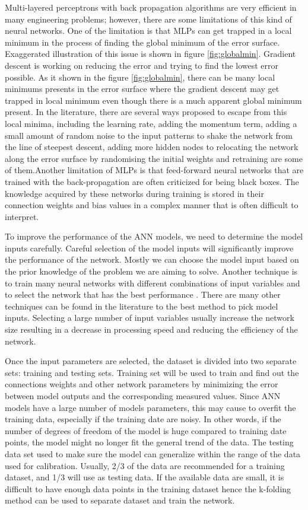 Multi-layered perceptrons with back propagation algorithms are very efficient in many engineering problems; however, there are some limitations of this kind of neural networks. One of the limitation is that MLPs can get trapped in a local minimum in the process of finding the global minimum of the error surface. Exaggerated illustration of this issue is shown in figure \ref{fig:globalmin}. Gradient descent is working on reducing the error and trying to find the lowest error possible. As it shown in the figure  \ref{fig:globalmin}, there can be many local minimums presents in the error surface where the gradient descent may get trapped in local minimum even though there is a much apparent global minimum present.  In the literature, there are several ways proposed to escape from this local minima, including the learning rate, adding the momentum term, adding a small amount of random noise to the input patterns to shake the network from the line of steepest descent, adding more hidden nodes to relocating the network along the error surface by randomising the initial weights and retraining are some of them.Another limitation of MLPs is that feed-forward neural networks that are trained with the back-propagation are often criticized for being black boxes. The knowledge acquired by these networks during training is stored in their connection weights and bias values in a complex manner that is often difficult to interpret. 


To improve the performance of the ANN models,  we need to determine the model inputs carefully. Careful selection of the model inputs will significantly improve the performance of the network. Mostly we can choose the model input based on the prior knowledge of the problem we are aiming to solve. Another technique is to train many neural networks with different combinations of input variables and to select the network that has the best performance \cite{teh1997prediction}. There are many other techniques can be found in the literature to the best method to pick model inputs. Selecting a large number of input variables usually increase the network size resulting in a decrease in processing speed and reducing the efficiency of the network. 

Once the input parameters are selected, the dataset is divided into two separate sets: training and testing sets. Training set will be used to train and find out the connections weights and other network parameters by minimizing the error between model outputs and the corresponding measured values. Since ANN models have a large number of models parameters, this may cause to overfit the training data, especially if the training date are noisy. In other words, if the number of degrees of freedom of the model is huge compared to training date points, the model might no longer fit the general trend of the data. The testing data set used to make sure the model can generalize within the range of the data used for calibration. Usually, 2/3 of the data are recommended for a training dataset, and 1/3 will use as testing data.  If the available data are small, it is difficult to have enough data points in the training dataset hence the k-folding method can be used to separate dataset and train the network.  

